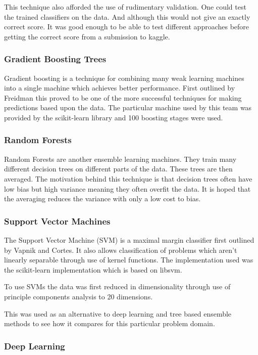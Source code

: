 \documentclass[a4paper, 11pt, twocolumn]{report}
\begin{document}
This technique also afforded the use of rudimentary validation. One could test the trained classifiers on the data. And although this would not give an exactly correct score. It was good enough to be able to test different approaches before getting the correct score from a submission to kaggle.


\subsubsection{Gradient Boosting Trees}
Gradient boosting is a technique for combining many weak learning machines into a single machine which achieves better performance. First outlined by Freidman \cite{friedman2001greedy} this proved to be one of the more successful techniques for making predictions based upon the data. The particular machine used by this team was provided by the scikit-learn library and 100 boosting stages were used.

\subsubsection{Random Forests}
Random Forests are another ensemble learning machines. They train many different decision trees on different parts of the data. These trees are then averaged. The motivation behind this technique is that decision trees often have low bias but high variance meaning they often overfit the data. It is hoped that the averaging reduces the variance with only a low cost to bias.


\subsubsection{Support Vector Machines}
The Support Vector Machine (SVM) is a maximal margin classifier first outlined by Vapnik and Cortes\cite{cortes1995support}. It also allows classification of problems which aren't linearly separable through use of kernel functions. The implementation used was the scikit-learn implementation which is based on libsvm.

To use SVMs the data was first reduced in dimensionality through use of principle components analysis to 20 dimensions.

This was used as an alternative to deep learning and tree based ensemble methods to see how it compares for this particular problem domain.

\subsubsection{Deep Learning}
\end{document}
